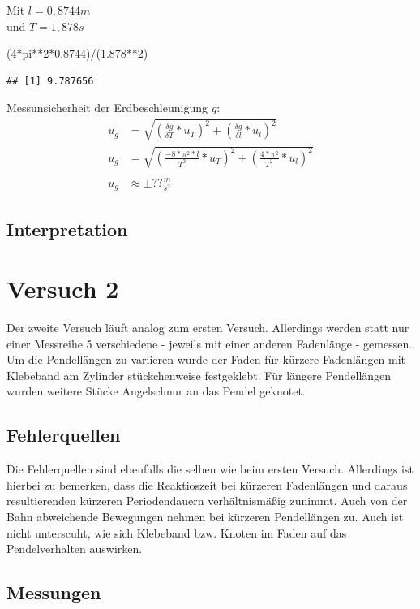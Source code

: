 \documentclass[
  9pt,
]{article}
\newenvironment{Shaded}{\begin{snugshade}}{\end{snugshade}}
\newcommand{\DecValTok}[1]{\textcolor[rgb]{0.00,0.00,0.81}{#1}}
\newcommand{\FloatTok}[1]{\textcolor[rgb]{0.00,0.00,0.81}{#1}}
\newcommand{\NormalTok}[1]{#1}
\newcommand{\SpecialCharTok}[1]{\textcolor[rgb]{0.00,0.00,0.00}{#1}}
\begin{document}
Mit \(l = 0,8744m\)\\
und \(T = 1,878s\)

\begin{Shaded}
\begin{Highlighting}[]
\NormalTok{(}\DecValTok{4}\SpecialCharTok{*}\NormalTok{pi}\SpecialCharTok{**}\DecValTok{2}\SpecialCharTok{*}\FloatTok{0.8744}\NormalTok{)}\SpecialCharTok{/}\NormalTok{(}\FloatTok{1.878}\SpecialCharTok{**}\DecValTok{2}\NormalTok{)}
\end{Highlighting}
\end{Shaded}

\begin{verbatim}
## [1] 9.787656
\end{verbatim}

Messunsicherheit der Erdbeschleunigung \(g\): \begin{equation*}
\begin{split}
u_g&=\sqrt{(\frac{\delta g}{\delta T}*u_T)^2+(\frac{\delta g}{\delta l}*u_l)^2}\\
u_g&=\sqrt{(\frac{-8*\pi^2*l}{T^3}*u_T)^2+(\frac{4*\pi^2}{T^2}*u_l)^2}\\
\\
u_g&\approx \pm ?? \frac{m}{s^2}
\end{split}
\end{equation*}

\hypertarget{interpretation}{%
\subsection{Interpretation}\label{interpretation}}

\hypertarget{versuch-2}{%
\section{Versuch 2}\label{versuch-2}}

Der zweite Versuch läuft analog zum ersten Versuch. Allerdings werden
statt nur einer Messreihe 5 verschiedene - jeweils mit einer anderen
Fadenlänge - gemessen. Um die Pendellängen zu variieren wurde der Faden
für kürzere Fadenlängen mit Klebeband am Zylinder stückchenweise
festgeklebt. Für längere Pendellängen wurden weitere Stücke Angelschnur
an das Pendel geknotet.

\hypertarget{fehlerquellen-1}{%
\subsection{Fehlerquellen}\label{fehlerquellen-1}}

Die Fehlerquellen sind ebenfalls die selben wie beim ersten Versuch.
Allerdings ist hierbei zu bemerken, dass die Reaktioszeit bei kürzeren
Fadenlängen und daraus resultierenden kürzeren Periodendauern
verhältnismäßig zunimmt. Auch von der Bahn abweichende Bewegungen nehmen
bei kürzeren Pendellängen zu. Auch ist nicht unterscuht, wie sich
Klebeband bzw. Knoten im Faden auf das Pendelverhalten auswirken.

\hypertarget{messungen-1}{%
\subsection{Messungen}\label{messungen-1}}
\end{document}
